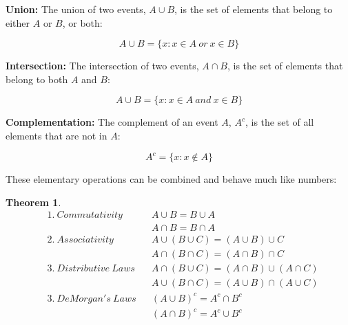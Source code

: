 \documentclass[
  oneside,
  11pt, a4paper,
  footinclude=true,
  headinclude=true,
  cleardoublepage=empty
]{scrbook}
\theoremstyle{definition}
\theoremstyle{definition}
\newtheorem{theorem}{Theorem}[section]
\begin{document}
            \vskip0.2cm
            \textbf{Union:} The union of two events, $A \cup B$, is the set of elements that belong to either $A$ or $B$, or both:
            
            \begin{equation}
                A \cup B = \{x : x \in A\ or\ x \in B\}
            \end{equation}{}
            
            \textbf{Intersection:} The intersection of two events, $A \cap B$, is the set of elements that belong to both $A$ and $B$:
            
            \begin{equation}
                A \cup B = \{x : x \in A\ and\ x \in B\}
            \end{equation}{}
            
            \textbf{Complementation:} The complement of an event $A$, $A^c$, is the set of all elements that are not in $A$:
            
            \begin{equation}
                A^c = \{x : x \notin A \}
            \end{equation}{}
            
            These elementary operations can be combined and behave much like numbers:
            
            \begin{theorem}{}
            \begin{align*}
                &1.\ Commutativity && A \cup B = B \cup A \\
                &                  && A \cap B = B \cap A \\
                &2.\ Associativity && A \cup (B \cup C) = (A \cup B) \cup C \\
                &                  && A \cap (B \cap C) = (A \cap B) \cap C \\
                &3.\ Distributive\ Laws && A \cap (B \cup C) = (A \cap B) \cup (A \cap C) \\
                &                       && A \cup (B \cap C) = (A \cup B) \cap (A \cup C) \\
                &3.\ DeMorgan's\ Laws && (A \cup B)^c = A^c \cap B^c \\
                &                     && (A \cap B)^c = A^c \cup B^c
            \end{align*}{}
            \end{theorem}
            
\end{document}
